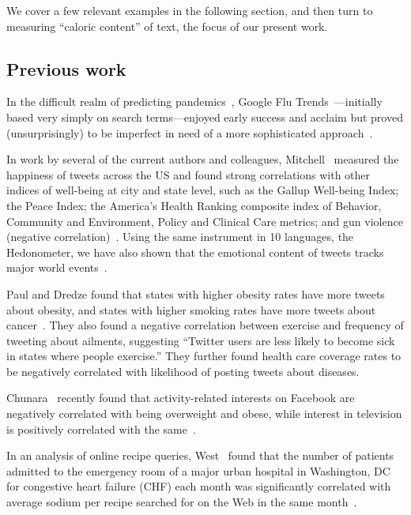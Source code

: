 We cover a few relevant examples in the following section, and then turn
to measuring ``caloric content'' of text, the focus of our present work.

\subsection*{Previous work}
\label{subsec:fluxwell.previouswork}

In the difficult realm of predicting pandemics~\cite{watts2005a}, 
Google Flu Trends~\cite{googleflutrends2015a}---initially 
based very simply on search terms---enjoyed early success and acclaim 
but proved (unsurprisingly)
to be imperfect in need of a more sophisticated approach~\cite{lazer2014a}.

In work by several of the current authors and colleagues,
Mitchell \etal\ measured the happiness of tweets across the US  and found
strong correlations with other indices of well-being at city
and state level, such as the
Gallup Well-being Index; the Peace Index; the America's Health Ranking
composite index of Behavior, Community and Environment, Policy and
Clinical Care metrics; and gun violence (negative
correlation)~\cite{mitchell2013a}. 
Using the same instrument in 10 languages, the Hedonometer, 
we have also shown that 
the emotional content of tweets tracks major world
events~\cite{dodds2011e,dodds2015a}.

Paul and Dredze found that states with higher
obesity rates have more tweets about obesity, and states with higher
smoking rates have more tweets about cancer~\cite{paul2011}.  They also found a
negative correlation between exercise and frequency of tweeting about
ailments, suggesting ``Twitter
users are less likely to become sick in states where people exercise.''
They further found health care coverage rates to be
negatively correlated with likelihood of posting tweets about
diseases.  

Chunara \etal\ recently found that
activity-related interests on Facebook are negatively correlated with
being overweight and obese, while interest in television is positively
correlated with the same~\cite{chunara2013}.  

In an analysis of online recipe queries, West \etal\ found
that the number of patients admitted to the emergency room of a major
urban hospital in Washington, DC for congestive heart failure (CHF)
each month was significantly correlated with average sodium per recipe
searched for on the Web in the same month~\cite{west2013}.

